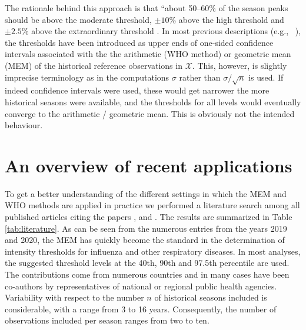 \documentclass{article}
\begin{document}
\noindent The rationale behind this approach is that ``about 50--60\% of the season peaks should be above the moderate threshold, $\pm 10\%$ above the high threshold and $\pm 2.5\%$ above the extraordinary threshold \citep{WHO2017}. In most previous descriptions (e.g., \ \citealt{WHO2014, Vega2015}), the thresholds have been introduced as upper ends of one-sided confidence intervals associated with the the arithmetic (WHO method) or geometric mean (MEM) of the historical reference observations in $\mathcal{X}$. This, however, is slightly imprecise terminology as in the computations $\sigma$ rather than $\sigma/\sqrt{n}$ is used. If indeed confidence intervals were used, these would get narrower the more historical seasons were available, and the thresholds for all levels would eventually converge to the arithmetic / geometric mean. This is obviously not the intended behaviour.


\section{An overview of recent applications}
\label{sec:recent_applications}

To get a better understanding of the different settings in which the MEM and WHO methods are applied in practice we performed a literature search among all published articles citing the papers \cite{Vega2015}, \cite{WHO2014} and \cite{WHO2017}. The results are summarized in Table \ref{tab:literature}. As can be seen from the numerous entries from the years 2019 and 2020, the MEM has quickly become the standard in the determination of intensity thresholds for influenza and other respiratory diseases. In most analyses, the suggested threshold levels at the 40th, 90th and 97.5th percentile are used. The contributions come from numerous countries and in many cases have been co-authors by representatives of national or regional public health agencies. Variability with respect to the number $n$ of historical seasons included is considerable, with a range from 3 to 16 years. Consequently, the number of observations included per season ranges from two to ten.
\end{document}
